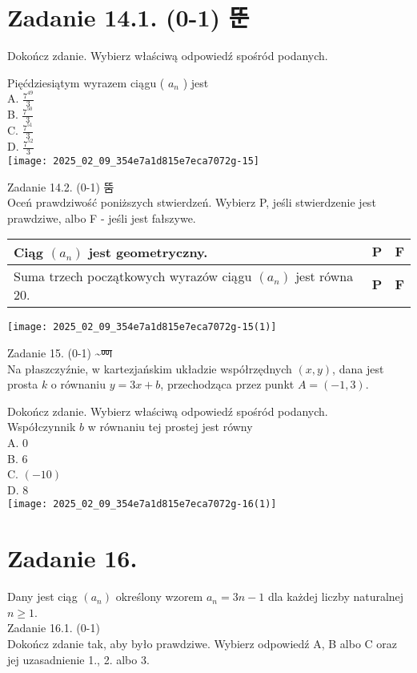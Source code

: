 \documentclass[10pt]{article}
\begin{document}
\section*{Zadanie 14.1. (0-1) 뚠}
Dokończ zdanie. Wybierz właściwą odpowiedź spośród podanych.

Pięćdziesiątym wyrazem ciągu ( \(a_{n}\) ) jest\\
A. \(\frac{7^{49}}{3}\)\\
B. \(\frac{7^{50}}{3}\)\\
C. \(\frac{7^{51}}{3}\)\\
D. \(\frac{7^{52}}{3}\)\\
\texttt{[image: 2025\_02\_09\_354e7a1d815e7eca7072g-15]}

Zadanie 14.2. (0-1) 뚬\\
Oceń prawdziwość poniższych stwierdzeń. Wybierz P, jeśli stwierdzenie jest prawdziwe, albo F - jeśli jest fałszywe.

\begin{center}
\begin{tabular}{|l|c|c|}
\hline
Ciąg \(\left(a_{n}\right)\) jest geometryczny. & \(\mathbf{P}\) & \(\mathbf{F}\) \\
\hline
Suma trzech początkowych wyrazów ciągu \(\left(a_{n}\right)\) jest równa 20. & \(\mathbf{P}\) & \(\mathbf{F}\) \\
\hline
\end{tabular}
\end{center}

\begin{center}
\texttt{[image: 2025\_02\_09\_354e7a1d815e7eca7072g-15(1)]}
\end{center}

Zadanie 15. (0-1) \~{}ण्ण\\
Na płaszczyźnie, w kartezjańskim układzie współrzędnych \((x, y)\), dana jest prosta \(k\) o równaniu \(y=3 x+b\), przechodząca przez punkt \(A=(-1,3)\).

Dokończ zdanie. Wybierz właściwą odpowiedź spośród podanych.\\
Współczynnik \(b\) w równaniu tej prostej jest równy\\
A. 0\\
B. 6\\
C. \((-10)\)\\
D. 8\\
\texttt{[image: 2025\_02\_09\_354e7a1d815e7eca7072g-16(1)]}

\section*{Zadanie 16.}
Dany jest ciąg \(\left(a_{n}\right)\) określony wzorem \(a_{n}=3 n-1\) dla każdej liczby naturalnej \(n \geq 1\).\\
Zadanie 16.1. (0-1)\\
Dokończ zdanie tak, aby było prawdziwe. Wybierz odpowiedź A, B albo C oraz jej uzasadnienie 1., 2. albo 3.
\end{document}
